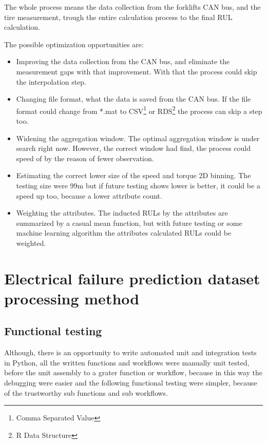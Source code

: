 The whole process means the data collection from the forklifts CAN bus, and the tire measurement, trough the entire calculation process to the final RUL calculation.

The possible optimization opportunities are:
\begin{itemize}
	\item{Improving the data collection from the CAN bus, and eliminate the measurement gaps with that improvement.} With that the process could skip the interpolation step. 
	\item{Changing file format, what the data is saved from the CAN bus.} If the file format could change from *.mat to CSV\footnote{Comma Separated Value} or RDS\footnote{R Data Structure} the process can skip a step too.
	\item{Widening the aggregation window.} The optimal aggregation window is under search right now. However, the correct window had find, the process could speed of by the reason of fewer observation.
	\item{Estimating the correct lower size of the speed and torque 2D binning.} The testing size were 9\*9m but if future testing shows lower is better, it could be a speed up too, because a lower attribute count.
	\item{Weighting the attributes.} The inducted RULs by the attributes are summarized by a casual mean function, but with future testing or some machine learning algorithm the attributes calculated RULs could be weighted.
\end{itemize} 
\section{Electrical failure prediction dataset processing method}
\subsection{Functional testing}
Although, there is an opportunity to write automated unit and integration tests in Python, all the written functions and workflows were manually unit tested, before the unit assembly to a grater function or workflow, because in this way the debugging were easier and the following functional testing were simpler, because of the trustworthy sub functions and sub workflows.

